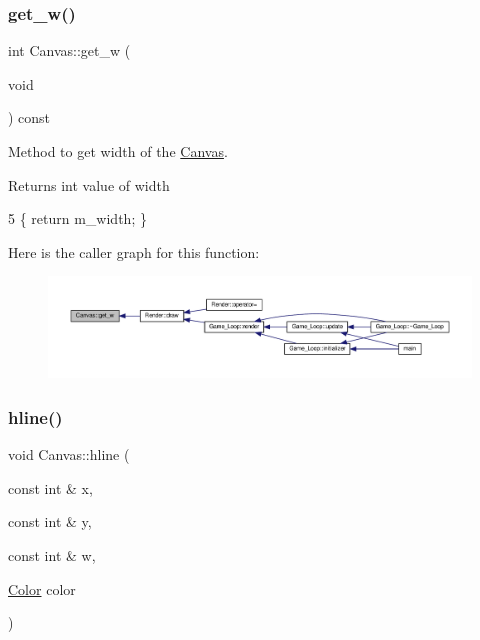 \subsubsection{\texorpdfstring{get\+\_\+w()}{get\_w()}}
{\footnotesize\ttfamily int Canvas\+::get\+\_\+w (\begin{DoxyParamCaption}\item[{void}]{ }\end{DoxyParamCaption}) const}



Method to get width of the \hyperlink{classCanvas}{Canvas}. 

\begin{DoxyReturn}{Returns}
int value of width 
\end{DoxyReturn}

\begin{DoxyCode}
5 \{ \textcolor{keywordflow}{return} m\_width; \}
\end{DoxyCode}
Here is the caller graph for this function\+:\nopagebreak
\begin{figure}[H]
\begin{center}
\leavevmode
\includegraphics[width=350pt]{classCanvas_a8478392f133ddaf1c9b7272a301c7898_icgraph}
\end{center}
\end{figure}
\mbox{\label{classCanvas_a3095d5ff2670c5dc9939454198865ceb}} 
\subsubsection{\texorpdfstring{hline()}{hline()}}
{\footnotesize\ttfamily void Canvas\+::hline (\begin{DoxyParamCaption}\item[{const int \&}]{x,  }\item[{const int \&}]{y,  }\item[{const int \&}]{w,  }\item[{\hyperlink{structColor}{Color}}]{color }\end{DoxyParamCaption})}



